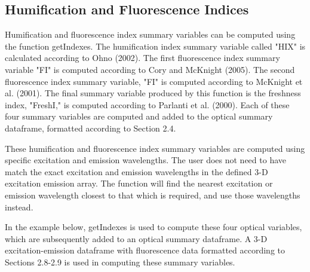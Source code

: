 \documentclass[a4paper,11pt]{article}\usepackage[]{graphicx}\usepackage[]{color}
\begin{document}
\subsection{Humification and Fluorescence Indices}
Humification and fluorescence index summary variables can be computed using the function getIndexes. The humification index summary variable called "HIX" is calculated according to Ohno (2002). The first fluorescence index summary variable "FI" is computed according to Cory and McKnight (2005). The second fluorescence index summary variable, "FI" is computed according to McKnight et al. (2001). The final summary variable produced by this function is the freshness index, "FreshI," is computed according to Parlanti et al. (2000). Each of these four summary variables are computed and added to the optical summary dataframe, formatted according to Section 2.4. 

These humification and fluorescence index summary variables are computed using specific excitation and emission wavelengths. The user does not need to have match the exact excitation and emission wavelengths in the defined 3-D excitation emission array. The function will find the nearest excitation or emission wavelength closest to that which is required, and use those wavelengths instead. 

In the example below, getIndexes is used to compute these four optical variables, which are subsequently added to an optical summary dataframe. A 3-D excitation-emission dataframe with fluorescence data formatted according to Sections 2.8-2.9 is used in computing these summary variables.
\end{document}
